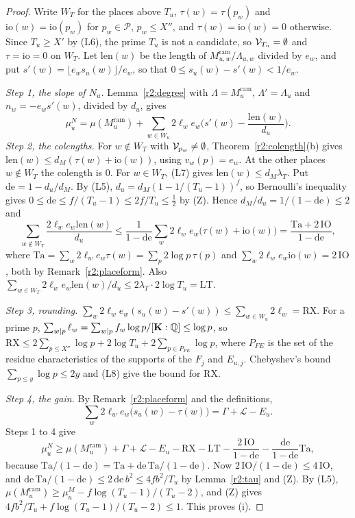 \begin{proof}
Write $W_T$ for the places above $T_u$, $\tau(w)=\tau(p_w)$ and $\mathrm{io}(w)=\mathrm{io}(p_w)$ for $p_w\in\mathcal P$, $p_w\le X''$, and $\tau(w)=\mathrm{io}(w)=0$ otherwise. Since $T_u\ge X'$ by (L6), the prime $T_u$ is not a candidate, so $\mathcal V_{T_u}=\emptyset$ and $\tau=\mathrm{io}=0$ on $W_T$. Let $\mathrm{len}(w)$ be the length of $M^{\mathrm{ram}}_{u,w}/\Lambda_{u,w}$ divided by $e_w$, and put $s'(w)=\lfloor e_ws_u(w)\rfloor/e_w$, so that $0\le s_u(w)-s'(w)<1/e_w$.

\emph{Step 1, the slope of $N_u$.} Lemma~\ref{r2:degree} with $\Lambda=M^{\mathrm{ram}}_u$, $\Lambda'=\Lambda_u$ and $n_w=-e_ws'(w)$, divided by $d_u$, gives
\[
\mu^N_u=\mu(M^{\mathrm{ram}}_u)+\sum_{w\in W_u}2\ell_we_w\Big(s'(w)-\frac{\mathrm{len}(w)}{d_u}\Big).
\]
\emph{Step 2, the colengths.} For $w\notin W_T$ with $\mathcal V_{p_w}\ne\emptyset$, Theorem~\ref{r2:colength}(b) gives $\mathrm{len}(w)\le d_M(\tau(w)+\mathrm{io}(w))$, using $v_w(p)=e_w$. At the other places $w\notin W_T$ the colength is $0$. For $w\in W_T$, (L7) gives $\mathrm{len}(w)\le d_M\lambda_T$. Put $\mathrm{de}=1-d_u/d_M$. By (L5), $d_u=d_M(1-1/(T_u-1))^f$, so Bernoulli's inequality gives $0\le\mathrm{de}\le f/(T_u-1)\le2f/T_u\le\frac12$ by (Z). Hence $d_M/d_u=1/(1-\mathrm{de})\le2$ and
\[
\sum_{w\notin W_T}\frac{2\ell_we_w\mathrm{len}(w)}{d_u}\le\frac1{1-\mathrm{de}}\sum_w2\ell_we_w\big(\tau(w)+\mathrm{io}(w)\big)=\frac{\mathrm{Ta}+2\,\mathrm{IO}}{1-\mathrm{de}},
\]
where $\mathrm{Ta}=\sum_w2\ell_we_w\tau(w)=\sum_p2\log p\,\tau(p)$ and $\sum_w2\ell_we_w\mathrm{io}(w)=2\,\mathrm{IO}$, both by Remark~\ref{r2:placeform}. Also $\sum_{w\in W_T}2\ell_we_w\mathrm{len}(w)/d_u\le2\lambda_T\cdot2\log T_u=\mathrm{LT}$.

\emph{Step 3, rounding.} $\sum_w2\ell_we_w(s_u(w)-s'(w))\le\sum_{w\in W_u}2\ell_w=\mathrm{RX}$. For a prime $p$, $\sum_{w\mid p}\ell_w=\sum_{w\mid p}f_w\log p/[\mathbf K:\mathbb Q]\le\log p$, so $\mathrm{RX}\le2\sum_{p\le X''}\log p+2\log T_u+2\sum_{p\in P_{FE}}\log p$, where $P_{FE}$ is the set of the residue characteristics of the supports of the $F_j$ and $E_{u,j}$. Chebyshev's bound $\sum_{p\le y}\log p\le2y$ and (L8) give the bound for $\mathrm{RX}$.

\emph{Step 4, the gain.} By Remark~\ref{r2:placeform} and the definitions,
\[
\sum_w2\ell_we_w\big(s_u(w)-\tau(w)\big)=\Gamma+\mathcal L-E_u .
\]
Steps 1 to 4 give
\[
\mu^N_u\ge\mu(M^{\mathrm{ram}}_u)+\Gamma+\mathcal L-E_u-\mathrm{RX}-\mathrm{LT}-\frac{2\,\mathrm{IO}}{1-\mathrm{de}}-\frac{\mathrm{de}}{1-\mathrm{de}}\mathrm{Ta},
\]
because $\mathrm{Ta}/(1-\mathrm{de})=\mathrm{Ta}+\mathrm{de}\,\mathrm{Ta}/(1-\mathrm{de})$. Now $2\,\mathrm{IO}/(1-\mathrm{de})\le4\,\mathrm{IO}$, and $\mathrm{de}\,\mathrm{Ta}/(1-\mathrm{de})\le2\,\mathrm{de}\,b^2\le4fb^2/T_u$ by Lemma~\ref{r2:tau} and (Z). By (L5), $\mu(M^{\mathrm{ram}}_u)\ge\mu^M_u-f\log(T_u-1)/(T_u-2)$, and (Z) gives $4fb^2/T_u+f\log(T_u-1)/(T_u-2)\le1$. This proves (i).


\end{proof}
